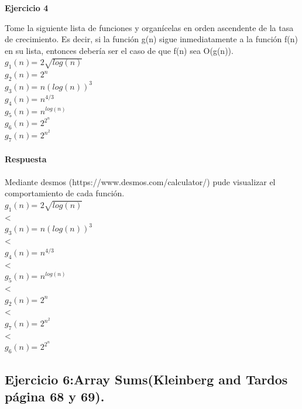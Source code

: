 \documentclass[a4paper,12pt]{article}
\begin{document}
\textbf{Ejercicio 4}

Tome la siguiente lista de funciones y organícelas en orden ascendente de la tasa de crecimiento. Es decir, si la función g(n) sigue inmediatamente a la función f(n) en su lista, entonces debería ser el caso de que f(n) sea O(g(n)).\\
 $g_{1}(n)$= $2\sqrt{log(n)}$\\
 $g_{2}(n)$= $2^n$\\
 $g_{3}(n)$= $n(log(n))^3$\\
 $g_{4}(n)$= $n^{4/3}$\\
 $g_{5}(n)$= $n^{log(n)}$\\
 $g_{6}(n)$= $2^{2^n}$\\
 $g_{7}(n)$= $2^{n^2}$\\\\

\textbf{Respuesta}\\\\
Mediante desmos (https://www.desmos.com/calculator/) pude visualizar el comportamiento de cada función.\\
 $g_{1}(n)$= $2\sqrt{log(n)}$\\
 <\\
 $g_{3}(n)$= $n(log(n))^3$\\
 <\\
 $g_{4}(n)$= $n^{4/3}$\\
 <\\
 $g_{5}(n)$= $n^{log(n)}$\\
 <\\
 $g_{2}(n)$= $2^n$\\
 <\\
 $g_{7}(n)$= $2^{n^2}$\\
 <\\
 $g_{6}(n)$= $2^{2^n}$\\


\subsection{Ejercicio 6:Array Sums(Kleinberg and Tardos página 68 y 69).}
\end{document}
